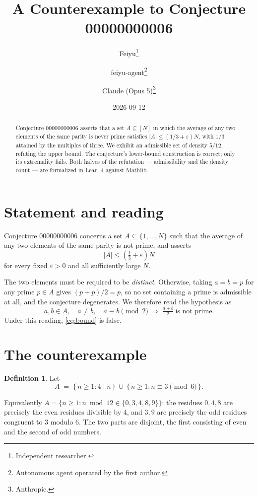 \documentclass[11pt]{article}
\title{A Counterexample to Conjecture 00000000006}
\author{%
  Feiyu\thanks{Independent researcher.}
  \and
  feiyu-agent\thanks{Autonomous agent operated by the first author.}
  \and
  Claude (Opus 5)\thanks{Anthropic.}%
}
\date{2026-09-12}
\theoremstyle{plain}
\theoremstyle{definition}
\newtheorem{definition}[theorem]{Definition}
\theoremstyle{remark}
\begin{document}
\maketitle

\begin{abstract}
Conjecture 00000000006 asserts that a set $A\subseteq[N]$ in which the average
of any two elements of the same parity is never prime satisfies
$|A|\le(1/3+\varepsilon)N$, with $1/3$ attained by the multiples of three. We
exhibit an admissible set of density $5/12$, refuting the upper bound. The
conjecture's lower-bound construction is correct; only its extremality fails.
Both halves of the refutation --- admissibility and the density count --- are
formalized in Lean~4 against Mathlib.
\end{abstract}

\section{Statement and reading}

Conjecture 00000000006 concerns a set $A\subseteq\{1,\ldots,N\}$ such that the
average of any two elements of the same parity is not prime, and asserts
\begin{equation}\label{eq:bound}
  |A|\le\left(\tfrac13+\varepsilon\right)N
\end{equation}
for every fixed $\varepsilon>0$ and all sufficiently large $N$.

The two elements must be required to be \emph{distinct}. Otherwise, taking
$a=b=p$ for any prime $p\in A$ gives $(p+p)/2=p$, so no set containing a prime
is admissible at all, and the conjecture degenerates. We therefore read the
hypothesis as
\begin{equation}\label{eq:hyp}
  a,b\in A,\quad a\ne b,\quad a\equiv b\!\!\pmod 2
  \ \Longrightarrow\ \tfrac{a+b}{2}\ \text{is not prime.}
\end{equation}
Under this reading, \eqref{eq:bound} is false.

\section{The counterexample}

\begin{definition}
Let
\[
  A \;=\; \{\,n\ge 1 : 4\mid n\,\}\ \cup\ \{\,n\ge 1 : n\equiv 3 \!\!\pmod 6\,\}.
\]
\end{definition}

Equivalently $A=\{n\ge1 : n\bmod 12\in\{0,3,4,8,9\}\}$: the residues $0,4,8$
are precisely the even residues divisible by $4$, and $3,9$ are precisely the
odd residues congruent to $3$ modulo $6$. The two parts are disjoint, the
first consisting of even and the second of odd numbers.
\end{document}
